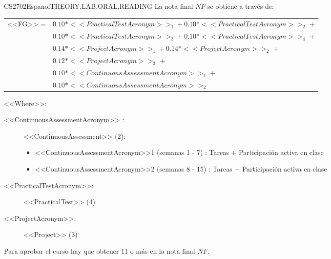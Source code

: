   \begin{evaluation}{CS2702}{Espanol}{THEORY,LAB,ORAL,READING}
  La nota final $NF$ se obtiene a través de:

  \begin{tabular}{cl}
    <<FG>> = & $0.10*<<PracticalTestAcronym>>_{1} + 0.10*<<PracticalTestAcronym>>_{2}$ + \\
             & $0.10*<<PracticalTestAcronym>>_{3} + 0.10*<<PracticalTestAcronym>>_{4}$ + \\
             & $0.14*<<ProjectAcronym>>_{1} + 0.14*<<ProjectAcronym>>_{2}$ + \\
             & $0.12*<<ProjectAcronym>>_{3}$ +\\
             & $0.10*<<ContinuousAssessmentAcronym>>_{1}$ +\\
             & $0.10*<<ContinuousAssessmentAcronym>>_{2}$
  \end{tabular}
 
  \noindent <<Where>>:
  \begin{description}
  \item[<<ContinuousAssessmentAcronym>> :] <<ContinuousAssessment>> (2):
  \begin{itemize}
             \item  <<ContinuousAssessmentAcronym>>1 (semanas 1 - 7) : Tareas + Participación activa en clase
              \item <<ContinuousAssessmentAcronym>>2 (semanas 8 - 15) : Tareas + Participación activa en clase
       \end{itemize}
      \item[<<PracticalTestAcronym>>:] <<PracticalTest>> (4)
      \item[<<ProjectAcronym>>:] <<Project>> (3)    
  \end{description}
  \noindent Para aprobar el curso hay que obtener 11 o más en la nota final $NF$.
  \end{evaluation}
 
